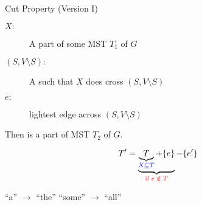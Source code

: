 
\begin{frame}{}
  \begin{center}
    {}
  \end{center}
\end{frame}

\begin{frame}{}
  \begin{exampleblock}{Cut Property (Version I)}
    \begin{description}
      \item[$X:$] A part of some MST $T_1$ of $G$
      \item[$(S, V \setminus S):$] A  such that $X$ does  cross $(S, V \setminus S)$
    ­ \item[$e:$]  lightest edge across $(S, V \setminus S)$
    \end{description}

    \pause
    \vspace{0.30cm}
    \begin{center}
      {Then  is a part of  MST $T_2$ of $G$.}
    \end{center}
  \end{exampleblock}

  \pause
  \vspace{0.60cm}
  \begin{center}
    {}
  \end{center}
\end{frame}

\begin{frame}{}
  \begin{center}
    {}
  \end{center}

  \pause
  \vspace{0.30cm}

  \pause
  \[
    T' = \underbrace{\underbrace{T}_{\textcolor{blue}{X \subseteq T}} + \{e\}}_{\textcolor{red}{\text{if } e \;\notin\; T}} - \{e'\}
  \]

  \pause
  \begin{center}
    {``a'' $\to$ ``the'' \red{$\implies$} ``some'' $\to$ ``all''}
  \end{center}
\end{frame}

